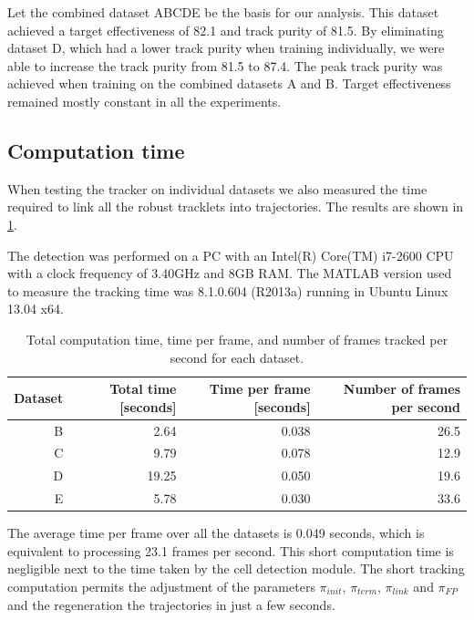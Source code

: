 		Let the combined dataset ABCDE be the basis for our analysis. This dataset achieved a target effectiveness of 82.1 and track purity of 81.5. By eliminating dataset D, which had a lower track purity when training individually, we were able to increase the track purity from 81.5 to 87.4. The peak track purity was achieved when training on the combined datasets A and B. Target effectiveness remained mostly constant in all the experiments.
		
	\subsection{Computation time}
	
	When testing the tracker on individual datasets we also measured the time required to link all the robust tracklets into trajectories. The results are shown in \cref{tab:results_tracker_speed}. 
	
	The detection was performed on a PC with an Intel(R) Core(TM) i7-2600 CPU with a clock frequency of 3.40GHz and 8GB RAM. The MATLAB version used to measure the tracking time was 8.1.0.604 (R2013a) running in Ubuntu Linux 13.04 x64.
	
	\begin{table}[h]
		\centering
		\begin{tabular}{rrrr}
			Dataset & Total time [seconds] & Time per frame [seconds] & Number of frames per second \\
		\hline
			      B &                 2.64 &                   0.038 &                     26.5 \\
			      C &                 9.79 &                   0.078 &                     12.9 \\
			      D &                19.25 &                   0.050 &                     19.6 \\
			      E &                 5.78 &                   0.030 &                     33.6
		\end{tabular} 
		\caption{Total computation time, time per frame, and number of frames tracked per second for each dataset.}
		\label{tab:results_tracker_speed}
	\end{table}
	
	The average time per frame over all the datasets is 0.049 seconds, which is equivalent to processing 23.1 frames per second. This short computation time is negligible next to the time taken by the cell detection module. The short tracking computation permits the adjustment of the parameters $\pi_{init}$, $\pi_{term}$, $\pi_{link}$ and $\pi_{FP}$ and the regeneration the trajectories in just a few seconds.
	
